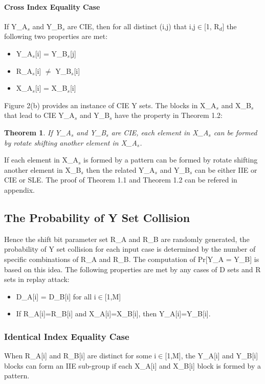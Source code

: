 \documentclass{article}
\newtheorem{theorem}{Theorem}[section]
\begin{document}
\paragraph{Cross Index Equality Case}
If Y\_A$_s$ and Y\_B$_s$ are CIE, then for all distinct (i,j) that i,j$\in$[1, R$_d$] the following two properties are met:
\begin{itemize}
	\item Y\_A$_s$[i] = Y\_B$_s$[j] 
	\item R\_A$_s$[i] $\neq$ Y\_B$_s$[i]
	\item X\_A$_s$[i] = X\_B$_s$[i]
\end{itemize}
Figure 2(b) provides an instance of CIE Y sets.
The blocks in X\_A$_s$ and X\_B$_s$ that lead to CIE Y\_A$_s$ and Y\_B$_s$ have the property in Theorem 1.2:
\begin{theorem}
If Y\_A$_s$ and Y\_B$_s$ are CIE, each element in X\_A$_s$ can be formed by rotate shifting another element in X\_A$_s$.
\end{theorem}

If each element in X\_A$_s$ is formed by a pattern can be formed by rotate shifting another element in X\_B$_s$ then the related Y\_A$_s$ and Y\_B$_s$ can be either IIE or CIE or SLE.
The proof of Theorem 1.1 and Theorem 1.2 can be refered in appendix.


\subsection{The Probability of Y Set Collision} 
Hence the shift bit parameter set R\_A and R\_B are randomly generated, the probability of Y set collision for each input case is determined by the number of specific combinations of R\_A and R\_B. The computation of Pr[Y\_A = Y\_B] is based on this idea.
The following properties are met by any cases of D sets and R sets in replay attack:
\begin{itemize}
	\item D\_A[i] = D\_B[i] for all i$\in$[1,M]
	\item If R\_A[i]=R\_B[i] and X\_A[i]=X\_B[i], then Y\_A[i]=Y\_B[i].
\end{itemize}

\subsubsection{Identical Index Equality Case}
When R\_A[i] and R\_B[i] are distinct for some i$\in$[1,M], the Y\_A[i] and Y\_B[i] blocks can form an IIE sub-group if each X\_A[i] and X\_B[i] block is formed by a pattern.
 
\end{document}
